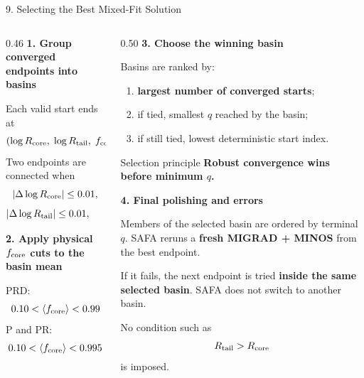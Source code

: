 \documentclass{beamer}
\begin{document}
\begin{frame}{9. Selecting the Best Mixed-Fit Solution}
\fontsize{6.3}{7.0}\selectfont

\begin{columns}[T]

\begin{column}{0.46\textwidth}
\textbf{1. Group converged endpoints into basins}

Each valid start ends at
\[
(\log R_{\rm core},\;\log R_{\rm tail},\;f_{\rm core}).
\]
Two endpoints are connected when
\[
|\Delta\log R_{\rm core}|\le0.01,
\]
\[
|\Delta\log R_{\rm tail}|\le0.01,
\qquad
|\Delta f_{\rm core}|\le0.01.
\]

\medskip
\textbf{2. Apply physical $f_{\rm core}$ cuts to the basin mean}

PRD:
\[
0.10<\langle f_{\rm core}\rangle<0.99
\]
P and PR:
\[
0.10<\langle f_{\rm core}\rangle<0.995
\]
\end{column}

\begin{column}{0.50\textwidth}
\textbf{3. Choose the winning basin}

Basins are ranked by:
\begin{enumerate}
    \setlength{\itemsep}{0.2em}
    \item \textbf{largest number of converged starts};
    \item if tied, smallest $q$ reached by the basin;
    \item if still tied, lowest deterministic start index.
\end{enumerate}

\begin{alertblock}{Selection principle}
\centering
\textbf{Robust convergence wins before minimum $q$.}
\end{alertblock}

\textbf{4. Final polishing and errors}

Members of the selected basin are ordered by terminal $q$. SAFA reruns a \textbf{fresh MIGRAD + MINOS} from the best endpoint.

If it fails, the next endpoint is tried \textbf{inside the same selected basin}. SAFA does not switch to another basin.

\medskip
No condition such as
\[
R_{\rm tail}>R_{\rm core}
\]
is imposed.
\end{column}

\end{columns}
\end{frame}
\end{document}
